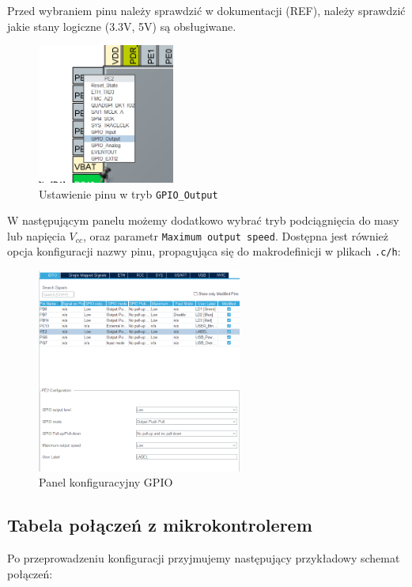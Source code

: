 \documentclass[11pt, a4paper]{article}
\begin{document}
Przed wybraniem pinu należy sprawdzić w dokumentacji (REF), należy sprawdzić jakie stany logiczne (3.3V, 5V)
są obsługiwane. 
\begin{figure}[h!]
    \centering
    \includegraphics[width=0.4\textwidth]{IMAGES/output.png}
    \caption{Ustawienie pinu w tryb \texttt{GPIO\_Output}}
\end{figure}

\newpage

W następującym panelu możemy dodatkowo wybrać tryb podciągnięcia do masy lub napięcia $V_{cc}$, oraz parametr
\texttt{Maximum output speed}.
Dostępna jest również opcja konfiguracji nazwy pinu, propagująca się do makrodefinicji w plikach \texttt{.c/h}:
\begin{figure}[h!]
    \centering
    \includegraphics[width=0.6\textwidth]{IMAGES/output_konf.png}
    \caption{Panel konfiguracyjny GPIO}
\end{figure}

\subsection* {Tabela połączeń z mikrokontrolerem}
Po przeprowadzeniu konfiguracji przyjmujemy następujący przykładowy schemat połączeń:
\end{document}
